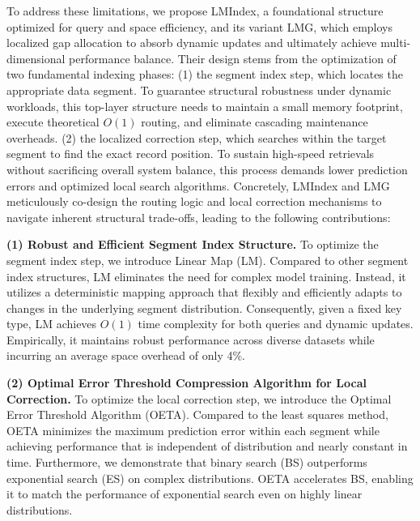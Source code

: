 To address these limitations, we propose LMIndex, a foundational structure optimized for query and space efficiency, and its variant LMG, which employs localized gap allocation to absorb dynamic updates and ultimately achieve multi-dimensional performance balance. Their design stems from the optimization of two fundamental indexing phases: (1) the segment index step, which locates the appropriate data segment. To guarantee structural robustness under dynamic workloads, this top-layer structure needs to maintain a small memory footprint, execute theoretical $O(1)$ routing, and eliminate cascading maintenance overheads. (2) the localized correction step, which searches within the target segment to find the exact record position. To sustain high-speed retrievals without sacrificing overall system balance, this process demands lower prediction errors and optimized local search algorithms. Concretely, LMIndex and LMG meticulously co-design the routing logic and local correction mechanisms to navigate inherent structural trade-offs, leading to the following contributions:


\textbf{(1) Robust and Efficient Segment Index Structure.} To optimize the segment index step, we introduce Linear Map (LM). Compared to other segment index structures, LM eliminates the need for complex model training. Instead, it utilizes a deterministic mapping approach that flexibly and efficiently adapts to changes in the underlying segment distribution. Consequently, given a fixed key type, LM achieves $O(1)$ time complexity for both queries and dynamic updates. Empirically, it maintains robust performance across diverse datasets while incurring an average space overhead of only 4\%.

\textbf{(2) Optimal Error Threshold Compression Algorithm for Local Correction.} To optimize the local correction step, we introduce the Optimal Error Threshold Algorithm (OETA). Compared to the least squares method, OETA minimizes the maximum prediction error within each segment while achieving performance that is independent of distribution and nearly constant in time. Furthermore, we demonstrate that binary search (BS) outperforms exponential search (ES) on complex distributions. OETA accelerates BS, enabling it to match the performance of exponential search even on highly linear distributions.

